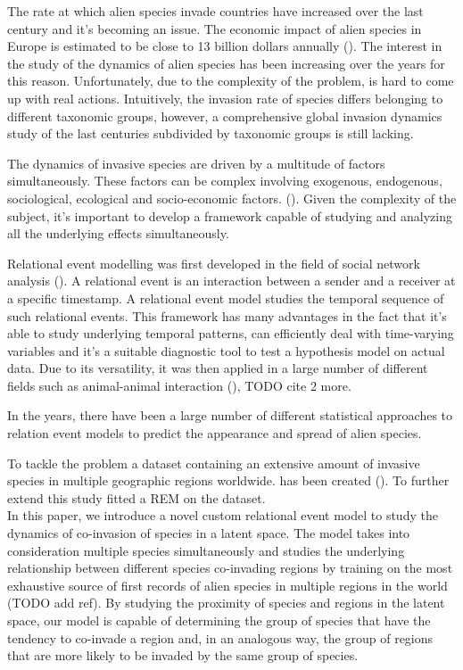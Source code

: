 \documentclass[mscthesis]{usiinfthesis}
\begin{document}
The rate at which alien species invade countries have increased over the last century and it's becoming an issue. The economic impact of alien species in Europe is estimated to be close to 13 billion dollars annually (\citet{intro:rate}). The interest in the study of the dynamics of alien species has been increasing over the years for this reason. Unfortunately, due to the complexity of the problem, is hard to come up with real actions. Intuitively, the invasion rate of species differs belonging to different taxonomic groups, however, a comprehensive global invasion dynamics study of the last centuries subdivided by taxonomic groups is still lacking. 

The dynamics of invasive species are driven by a multitude of factors simultaneously. These factors can be complex involving exogenous, endogenous, sociological, ecological and socio-economic factors. (\citet{intro:factors}). Given the complexity of the subject, it's important to develop a framework capable of studying and analyzing all the underlying effects simultaneously. 

Relational event modelling was first developed in the field of social network analysis (\citet{rem:butts}). A relational event is an interaction between a sender and a receiver at a specific timestamp. A relational event model studies the temporal sequence of such relational events. This framework has many advantages in the fact that it's able to study underlying temporal patterns, can efficiently deal with time-varying variables and it's a suitable diagnostic tool to test a hypothesis model on actual data. Due to its versatility, it was then applied in a large number of different fields such as animal-animal interaction (\citet{intro:cattle}), TODO cite 2 more.

In the years, there have been a large number of different statistical approaches to relation event models to predict the appearance and spread of alien species.  

To tackle the problem a dataset containing an extensive amount of invasive species in multiple geographic regions worldwide.  has been created (\citet{intro:dataset}). To further extend this study \citet{intro:ecological} fitted a REM on the dataset. \\

In this paper, we introduce a novel custom relational event model to study the dynamics of co-invasion of species in a latent space. The model takes into consideration multiple species simultaneously and studies the underlying relationship between different species co-invading regions by training on the most exhaustive source of first records of alien species in multiple regions in the world (TODO add ref). By studying the proximity of species and regions in the latent space, our model is capable of determining the group of species that have the tendency to co-invade a region and, in an analogous way, the group of regions that are more likely to be invaded by the same group of species.
\end{document}
